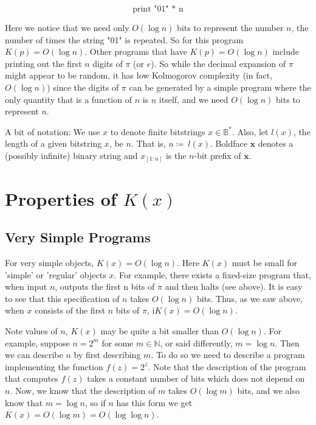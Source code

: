 \documentclass[11pt, oneside]{article}   	%
\begin{document}
\begin{equation*}
\label{eqn:python_print_string}
\text{print "01" * n} 
\end{equation*}

\bigskip
\noindent
Here we notice that we need only $O(\log n)$ bits to represent the number $n$, the number of 
times the string "01" is repeated.  So for this program $K(p) = O(\log n)$. Other programs that have 
$K(p) = O(\log n)$ include printing out the first $n$ digits of $\pi$ (or $e$). So while the decimal expansion
of $\pi$ might appear to be random, it has low Kolmogorov complexity (in fact,  $O(\log n)$) since the digits of $\pi$ can be 
generated by a simple program where the only quantity that
is a function of $n$ is $n$ itself, and we need $O(\log n)$ bits to represent $n$.

\bigskip
\noindent
A bit of notation: We use $x$ to denote finite bitstrings $x \in \mathbb{B}^*$.  Also, let $l(x)$, the length of a given bitstring $x$, be $n$. 
That is, $n \coloneqq\ l(x)$.  Boldface $\mathbf{x}$ denotes a (possibly infinite) binary string and $x_{[1:n]}$ is the $n$-bit prefix 
of $\mathbf{x}$. 

\section{Properties of $K(x)$} 
\label{sec:properties}


\subsection{Very Simple Programs}
For very simple objects,  $K(x) = O(\log n)$.  Here $K(x)$ must be small for 'simple' or 'regular' objects $x$. For example, there exists a fixed-size program that, 
when input $n$, outputs the first n bits of $\pi$ and then halts (see above). It is easy to see that this specification of $n$ takes $O(\log n)$ bits. Thus, as we saw above,
when $x$ consists of the first $n$ bits of $\pi$, i$K(x) = O(\log n)$. 

\bigskip
\noindent
Note values of $n$, $K(x)$ may be quite a bit smaller than $O(\log n)$. 
For example, suppose $n = 2^m$ for some $m \in \mathbb{N}$, or said differently, $m = \log n$.  Then we can describe $n$ by first describing $m$.
To do so we need to describe a program implementing the function $f(z) = 2^z$.  Note that the description of the program that computes $f(z)$ takes a constant 
number of bits which does not depend on $n$. Now, we know that the description of $m$ takes $O(\log m)$ bits, and we also know that 
$m = \log n$,  so if $n$ has this form we get $K(x) = O(\log m) = O(\log \log n)$.
\end{document}
